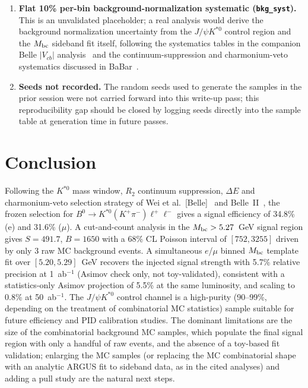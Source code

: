 \documentclass[11pt]{article}
\begin{document}
\begin{enumerate}
{fit.} Using only $M_{\rm bc}$ discards the extra discriminating power
of $\Delta E$ within the already-applied window and likely makes this
study's precision estimate conservative relative to a full 2D fit.
\item \textbf{Flat 10\% per-bin background-normalization systematic
(\texttt{bkg\_syst}).} This is an unvalidated placeholder; a real
analysis would derive the background normalization uncertainty from the
$J/\psi K^{*0}$ control region and the $M_{\rm bc}$ sideband fit
itself, following the systematics tables in the companion Belle
$|V_{cb}|$ analysis~\cite{Waheed2019} and the continuum-suppression and
charmonium-veto systematics discussed in BaBar~\cite{Lees2012}.
\item \textbf{Seeds not recorded.} The random seeds used to generate
the samples in the prior session were not carried forward into this
write-up pass; this reproducibility gap should be closed by logging
seeds directly into the sample table at generation time in future
passes.
\end{enumerate}

\section{Conclusion}

Following the $K^{*0}$ mass window, $R_2$ continuum suppression,
$\Delta E$ and charmonium-veto selection strategy of Wei et
al.~[Belle]~\cite{Wei2009} and Belle~II~\cite{BelleII2022}, the frozen
selection for $B^0\to K^{*0}(K^+\pi^-)\ell^+\ell^-$ gives a signal
efficiency of 34.8\% (e) and 31.6\% ($\mu$). A cut-and-count analysis in
the $M_{\rm bc}>5.27$~GeV signal region gives $S=491.7$, $B=1650$ with a
68\% CL Poisson interval of $[752,3255]$ driven by only 3 raw MC
background events. A simultaneous $e$/$\mu$ binned $M_{\rm bc}$
template fit over $[5.20,5.29]$~GeV recovers the injected signal
strength with 5.7\% relative precision at 1~ab$^{-1}$ (Asimov check
only, not toy-validated), consistent with a statistics-only Asimov
projection of 5.5\% at the same luminosity, and scaling to 0.8\% at
50~ab$^{-1}$. The $J/\psi K^{*0}$ control channel is a high-purity
(90--99\%, depending on the treatment of combinatorial MC statistics)
sample suitable for future efficiency and PID calibration studies. The
dominant limitations are the size of the combinatorial background MC
samples, which populate the final signal region with only a handful of
raw events, and the absence of a toy-based fit validation; enlarging
the MC samples (or replacing the MC combinatorial shape with an
analytic ARGUS fit to sideband data, as in the cited analyses) and
adding a pull study are the natural next steps.
\end{document}
